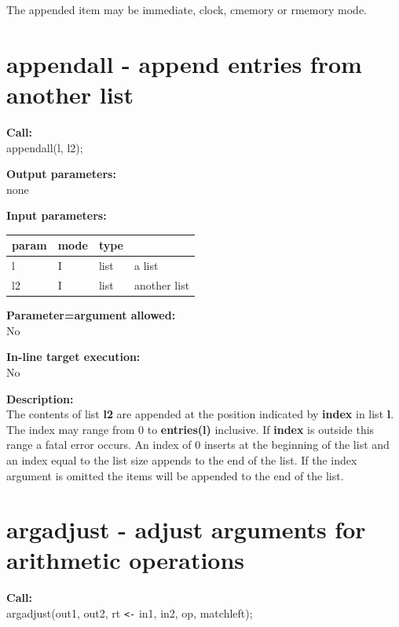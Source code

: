         The appended item may be immediate, clock, cmemory or rmemory mode.


    \section{appendall - append entries from another list}\label{sec:ipappendall}
        
        {\bf Call:} \\
        appendall(l, l2);
        
        {\bf Output parameters:} \\
        none
        
        {\bf Input parameters:} \\
        \begin{tabular}{| l | l | l | l |}
        \hline
        param  & mode & type & \\
        \hline \hline
        l      & I     & list & a list   \\ \hline
        l2     & I     & list & another list   \\ \hline
        \end{tabular}
        
        {\bf Parameter=argument allowed:} \\
        No
        
        {\bf In-line target execution:} \\
        No
        
        {\bf Description:} \\
        The contents of list {\bf l2} are appended at the position indicated
        by {\bf index} in list {\bf l}. The index may range from 0 to {\bf
        entries(l)} inclusive. If {\bf index} is outside this range a fatal
        error occurs. An index of 0 inserts at the beginning of the list and
        an index equal to the list size appends to the end of the list. If
        the index argument is omitted the items will be appended to the end
        of the list.
        


    \section{argadjust - adjust arguments for arithmetic operations}\label{sec:ipargadjust}
        
        {\bf Call:} \\
        argadjust(out1, out2, rt \verb'<-' in1, in2, op, matchleft);
        
